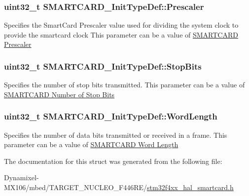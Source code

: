 \subsubsection[{\texorpdfstring{Prescaler}{Prescaler}}]{\setlength{\rightskip}{0pt plus 5cm}uint32\+\_\+t S\+M\+A\+R\+T\+C\+A\+R\+D\+\_\+\+Init\+Type\+Def\+::\+Prescaler}\hypertarget{struct_s_m_a_r_t_c_a_r_d___init_type_def_a7ff96c14ecfbe219a2773a1a2cf897a4}{}\label{struct_s_m_a_r_t_c_a_r_d___init_type_def_a7ff96c14ecfbe219a2773a1a2cf897a4}
Specifies the Smart\+Card Prescaler value used for dividing the system clock to provide the smartcard clock This parameter can be a value of \hyperlink{group___s_m_a_r_t_c_a_r_d___prescaler}{S\+M\+A\+R\+T\+C\+A\+RD Prescaler} 
\subsubsection[{\texorpdfstring{Stop\+Bits}{StopBits}}]{\setlength{\rightskip}{0pt plus 5cm}uint32\+\_\+t S\+M\+A\+R\+T\+C\+A\+R\+D\+\_\+\+Init\+Type\+Def\+::\+Stop\+Bits}\hypertarget{struct_s_m_a_r_t_c_a_r_d___init_type_def_ac0eb966bac71de17ace31fa5214c23f9}{}\label{struct_s_m_a_r_t_c_a_r_d___init_type_def_ac0eb966bac71de17ace31fa5214c23f9}
Specifies the number of stop bits transmitted. This parameter can be a value of \hyperlink{group___s_m_a_r_t_c_a_r_d___stop___bits}{S\+M\+A\+R\+T\+C\+A\+RD Number of Stop Bits} 
\subsubsection[{\texorpdfstring{Word\+Length}{WordLength}}]{\setlength{\rightskip}{0pt plus 5cm}uint32\+\_\+t S\+M\+A\+R\+T\+C\+A\+R\+D\+\_\+\+Init\+Type\+Def\+::\+Word\+Length}\hypertarget{struct_s_m_a_r_t_c_a_r_d___init_type_def_a16a8ba82fbc742510824bb0d8e85fbbc}{}\label{struct_s_m_a_r_t_c_a_r_d___init_type_def_a16a8ba82fbc742510824bb0d8e85fbbc}
Specifies the number of data bits transmitted or received in a frame. This parameter can be a value of \hyperlink{group___s_m_a_r_t_c_a_r_d___word___length}{S\+M\+A\+R\+T\+C\+A\+RD Word Length} 

The documentation for this struct was generated from the following file\+:\begin{DoxyCompactItemize}
\item 
Dynamixel-\/\+M\+X106/mbed/\+T\+A\+R\+G\+E\+T\+\_\+\+N\+U\+C\+L\+E\+O\+\_\+\+F446\+R\+E/\hyperlink{stm32f4xx__hal__smartcard_8h}{stm32f4xx\+\_\+hal\+\_\+smartcard.\+h}\end{DoxyCompactItemize}
